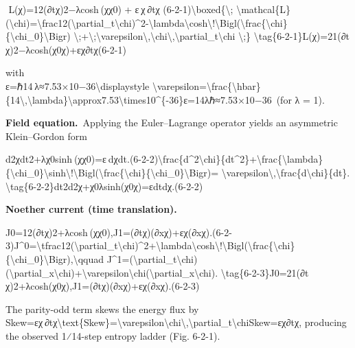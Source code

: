   L(χ)=12(∂tχ)2−λcosh⁡ ⁣(χχ0)  +  ε χ ∂tχ  (6-2-1)\textbackslash{}boxed\{\textbackslash{};
\textbackslash{}mathcal\{L\}(\textbackslash{}chi)=\textbackslash{}frac12(\textbackslash{}partial\_t\textbackslash{}chi)\^{}2-\textbackslash{}lambda\textbackslash{}cosh\textbackslash{}!\textbackslash{}Bigl(\textbackslash{}frac\{\textbackslash{}chi\}\{\textbackslash{}chi\_0\}\textbackslash{}Bigr)
\textbackslash{};+\textbackslash{};\textbackslash{}varepsilon\textbackslash{},\textbackslash{}chi\textbackslash{},\textbackslash{}partial\_t\textbackslash{}chi
\textbackslash{};\}
\textbackslash{}tag\{6-2-1\}L(χ)=21​(∂t​χ)2−λcosh(χ0​χ​)+εχ∂t​χ​(6-2-1)

with\\
ε=ℏ14 λ≈7.53×10−36\textbackslash{}displaystyle
\textbackslash{}varepsilon=\textbackslash{}frac\{\textbackslash{}hbar\}\{14\textbackslash{},\textbackslash{}lambda\}\textbackslash{}approx7.53\textbackslash{}times10\^{}\{-36\}ε=14λℏ​≈7.53×10−36 (for
λ = 1).

\textbf{Field equation.} Applying the Euler--Lagrange operator yields an
asymmetric Klein--Gordon form

d2χdt2+λχ0sinh⁡ ⁣(χχ0)=ε dχdt.(6-2-2)\textbackslash{}frac\{d\^{}2\textbackslash{}chi\}\{dt\^{}2\}+\textbackslash{}frac\{\textbackslash{}lambda\}\{\textbackslash{}chi\_0\}\textbackslash{}sinh\textbackslash{}!\textbackslash{}Bigl(\textbackslash{}frac\{\textbackslash{}chi\}\{\textbackslash{}chi\_0\}\textbackslash{}Bigr)=
\textbackslash{}varepsilon\textbackslash{},\textbackslash{}frac\{d\textbackslash{}chi\}\{dt\}.
\textbackslash{}tag\{6-2-2\}dt2d2χ​+χ0​λ​sinh(χ0​χ​)=εdtdχ​.(6-2-2)

\textbf{Noether current (time translation).}

J0=12(∂tχ)2+λcosh⁡ ⁣(χχ0),J1=(∂tχ)(∂xχ)+εχ(∂xχ).(6-2-3)J\^{}0=\textbackslash{}tfrac12(\textbackslash{}partial\_t\textbackslash{}chi)\^{}2+\textbackslash{}lambda\textbackslash{}cosh\textbackslash{}!\textbackslash{}Bigl(\textbackslash{}frac\{\textbackslash{}chi\}\{\textbackslash{}chi\_0\}\textbackslash{}Bigr),\textbackslash{}qquad
J\^{}1=(\textbackslash{}partial\_t\textbackslash{}chi)(\textbackslash{}partial\_x\textbackslash{}chi)+\textbackslash{}varepsilon\textbackslash{}chi(\textbackslash{}partial\_x\textbackslash{}chi).
\textbackslash{}tag\{6-2-3\}J0=21​(∂t​χ)2+λcosh(χ0​χ​),J1=(∂t​χ)(∂x​χ)+εχ(∂x​χ).(6-2-3)

The parity-odd term skews the energy flux by\\
Skew=εχ ∂tχ\textbackslash{}text\{Skew\}=\textbackslash{}varepsilon\textbackslash{}chi\textbackslash{},\textbackslash{}partial\_t\textbackslash{}chiSkew=εχ∂t​χ,
producing the observed 1⁄14-step entropy ladder (Fig. 6-2-1).

